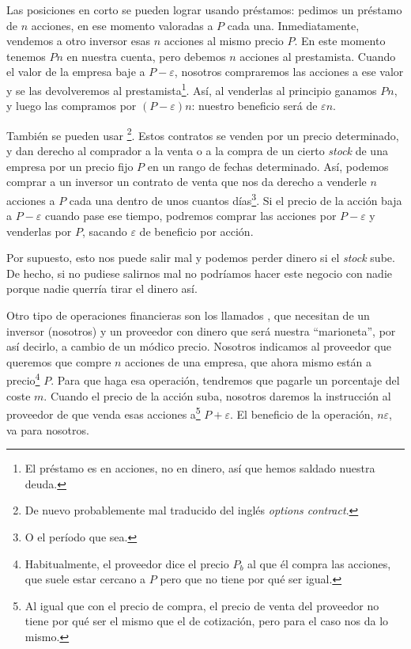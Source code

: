 \documentclass[nochap,palatino,shortheader]{apuntes}
\begin{document}
Las posiciones en corto se pueden lograr usando préstamos: pedimos un préstamo de $n$ acciones, en ese momento valoradas a $P$ cada una. Inmediatamente, vendemos a otro inversor esas $n$ acciones al mismo precio $P$. En este momento tenemos $Pn$ en nuestra cuenta, pero debemos $n$ acciones al prestamista. Cuando el valor de la empresa baje a $P-ε$, nosotros compraremos las acciones a ese valor y se las devolveremos al prestamista\footnote{El préstamo es en acciones, no en dinero, así que hemos saldado nuestra deuda.}. Así, al venderlas al principio ganamos $Pn$, y luego las compramos por $(P-ε)n$: nuestro beneficio será de $εn$.

También se pueden usar \footnote{De nuevo probablemente mal traducido del inglés \textit{options contract}.}. Estos contratos se venden por un precio determinado, y dan derecho al comprador a la venta o a la compra de un cierto \textit{stock} de una empresa por un precio fijo $P$ en un rango de fechas determinado. Así, podemos comprar a un inversor un contrato de venta que nos da derecho a venderle $n$ acciones a $P$ cada una dentro de unos cuantos días\footnote{O el período que sea.}. Si el precio de la acción baja a $P - ε$ cuando pase ese tiempo, podremos comprar las acciones por $P - ε$ y venderlas por $P$, sacando $ε$ de beneficio por acción.

Por supuesto, esto nos puede salir mal y podemos perder dinero si el \textit{stock} sube. De hecho, si no pudiese salirnos mal no podríamos hacer este negocio con nadie porque nadie querría tirar el dinero así.

Otro tipo de operaciones financieras son los llamados , que necesitan de un inversor (nosotros) y un proveedor con dinero que será nuestra ``marioneta'', por así decirlo, a cambio de un módico precio. Nosotros indicamos al proveedor que queremos que compre $n$ acciones de una empresa, que ahora mismo están a precio\footnote{Habitualmente, el proveedor dice el precio $P_b$ al que él compra las acciones, que suele estar cercano a $P$ pero que no tiene por qué ser igual.} $P$. Para que haga esa operación, tendremos que pagarle un porcentaje del coste $m$. Cuando el precio de la acción suba, nosotros daremos la instrucción al proveedor de que venda esas acciones a\footnote{Al igual que con el precio de compra, el precio de venta del proveedor no tiene por qué ser el mismo que el de cotización, pero para el caso nos da lo mismo.} $P + ε$. El beneficio de la operación, $nε$, va para nosotros.
\end{document}

